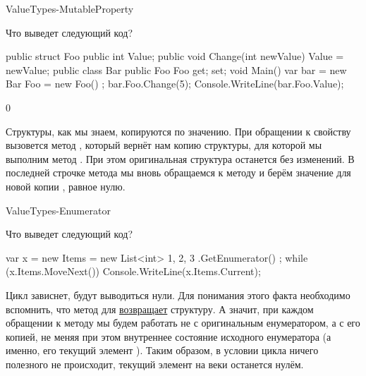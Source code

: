 \begin{defproblem}{ValueTypes-MutableProperty}
\begin{onlyproblem}
  Что выведет следующий код?
  \begin{source}
  public struct Foo
  {
    public int Value;
    public void Change(int newValue)
    {
      Value = newValue;
    }
  }
  public class Bar
  {
    public Foo Foo { get; set; }
  }
  void Main()
  {
    var bar = new Bar { Foo = new Foo() };
    bar.Foo.Change(5);
    Console.WriteLine(bar.Foo.Value);
  }
  \end{source}
\end{onlyproblem}
\begin{onlysolution}
  \begin{source}
  0
  \end{source}
  Структуры, как мы знаем, копируются по значению. При обращении к свойству  вызовется метод , который вернёт нам копию структуры, для которой мы выполним метод . При этом оригинальная структура останется без изменений. В последней строчке метода  мы вновь обращаемся к методу  и берём значение  для новой копии , равное нулю.
\end{onlysolution}
\end{defproblem}
\begin{defproblem}{ValueTypes-Enumerator}
\begin{onlyproblem}
  Что выведет следующий код?
  \begin{source}
   var x = new 
     {
       Items = new List<int> { 1, 2, 3 }.GetEnumerator()
     };
   while (x.Items.MoveNext())
     Console.WriteLine(x.Items.Current);
  \end{source}
\end{onlyproblem}
\begin{onlysolution}
  Цикл зависнет, будут выводиться нули. Для понимания этого факта необходимо вспомнить, что метод  для  \href{http://msdn.microsoft.com/en-us/library/x854yt9s(v=vs.110).aspx}{возвращает} структуру. А значит, при каждом обращении к методу  мы будем работать не с оригинальным енумератором, а с его копией, не меняя при этом внутреннее состояние исходного енумератора (а именно, его текущий элемент ). Таким образом, в условии цикла ничего полезного не происходит, текущий элемент на веки останется нулём.
\end{onlysolution}
\end{defproblem}
